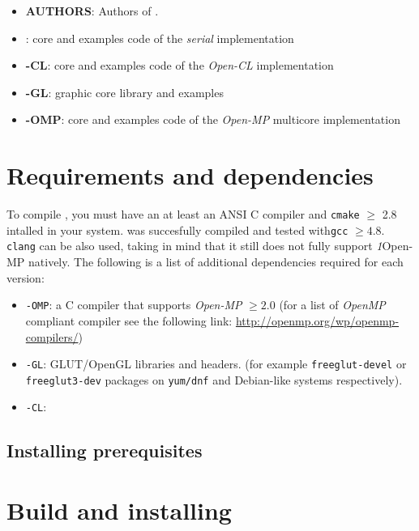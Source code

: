 \begin{itemize}

	
    \item \textbf{AUTHORS}: Authors of \texttt{\ocal}.
	\item \textbf{\ocal}: core and examples code of the \emph{serial} implementation  
	\item \textbf{\ocal-CL}:  core and examples code of the \emph{Open-CL} implementation  
	\item \textbf{\ocal-GL}:  \texttt{\ocal} graphic core library and examples   
	\item \textbf{\ocal-OMP}:  core and examples code of the \emph{Open-MP}  multicore implementation  

\end{itemize}


\section{Requirements and dependencies}

To compile \texttt{\ocal}, you must have an at least an ANSI C compiler and \texttt{cmake} $\geq$ 2.8 intalled in your system.
\ocal was succesfully compiled and tested with\texttt{gcc} $\geq 4.8$. \texttt{clang} can be also used, taking in mind that it still does not fully support  \emph1{Open-MP} natively.
The following is a list of additional dependencies required for each \ocal version:

\begin{itemize}
	\item \texttt{\ocal-OMP}: a C compiler that supports \emph{Open-MP} $\geq 2.0$ (for a list of \emph{OpenMP} compliant compiler see the following link: \url{http://openmp.org/wp/openmp-compilers/})
	\item  \texttt{\ocal-GL}: GLUT/OpenGL libraries and headers. (for example \texttt{freeglut-devel} or \texttt{freeglut3-dev} packages on \texttt{yum/dnf} and Debian-like systems respectively).
	\item \texttt{\ocal-CL}: 
\end{itemize}



\subsection{Installing prerequisites}


\section{Build and installing}

